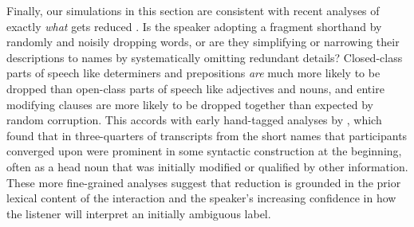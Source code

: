 Finally, our simulations in this section are consistent with recent analyses of exactly \emph{what} gets reduced \cite{hawkins2020characterizing}.
Is the speaker adopting a fragment shorthand by randomly and noisily dropping words, or are they simplifying or narrowing their descriptions to names by systematically omitting redundant details?
Closed-class parts of speech like determiners and prepositions \emph{are} much more likely to be dropped than open-class parts of speech like adjectives and nouns, and entire modifying clauses are more likely to be dropped together than expected by random corruption.
This accords with early hand-tagged analyses by , which found that in three-quarters of transcripts from  the short names that participants converged upon were prominent in some syntactic construction at the beginning, often as a head noun that was initially modified or qualified by other information. 
These more fine-grained analyses suggest that reduction is grounded in the prior lexical content of the interaction and the speaker's increasing confidence in how the listener will interpret an initially ambiguous label. 

